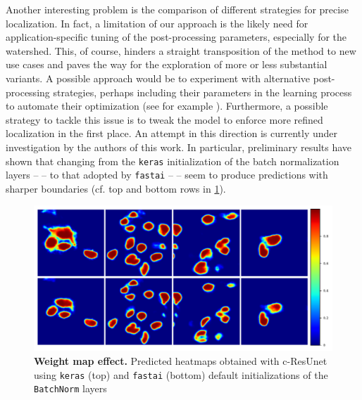 Another interesting problem is the comparison of different strategies for precise localization. In fact, a limitation of our approach is the likely need for application-specific tuning of the post-processing parameters, especially for the watershed.
This, of course, hinders a straight transposition of the method to new use cases and paves the way for the exploration of more or less substantial variants.
A possible approach would be to experiment with alternative post-processing strategies, perhaps including their parameters in the learning process to automate their optimization (see for example ).
Furthermore, a possible strategy to tackle this issue is to tweak the model to enforce more refined localization in the first place.
An attempt in this direction is currently under investigation by the authors of this work.
In particular, preliminary results have shown that changing from the \texttt{keras} initialization of the batch normalization layers --  -- to that adopted by \texttt{fastai} \cite{2020fastai} --  -- seem to produce predictions with sharper boundaries (cf. top and bottom rows in \cref{fig:kerasVSfastai_bathnorm}).
\begin{figure}
\centering
\includegraphics[width=\textwidth]{figures/610_future_works/Tc-ResUnetVSBbatchnorm_effect.pdf}
\caption{\textbf{Weight map effect.} 
Predicted heatmaps obtained with c-ResUnet using \texttt{keras} (top) and \texttt{fastai} (bottom) default initializations of the \texttt{BatchNorm} layers} 
\label{fig:kerasVSfastai_bathnorm}
\end{figure}

